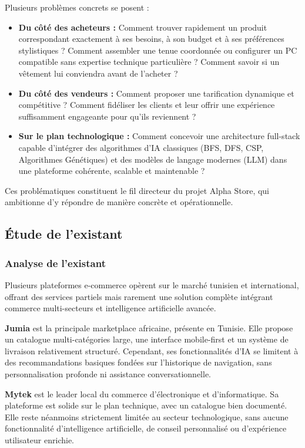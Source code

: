 Plusieurs problèmes concrets se posent :

\begin{itemize}[label=$\bullet$]
    \item \textbf{Du côté des acheteurs :} Comment trouver rapidement un produit correspondant exactement à ses besoins, à son budget et à ses préférences stylistiques ? Comment assembler une tenue coordonnée ou configurer un PC compatible sans expertise technique particulière ? Comment savoir si un vêtement lui conviendra avant de l'acheter ?
    \item \textbf{Du côté des vendeurs :} Comment proposer une tarification dynamique et compétitive ? Comment fidéliser les clients et leur offrir une expérience suffisamment engageante pour qu'ils reviennent ?
    \item \textbf{Sur le plan technologique :} Comment concevoir une architecture full-stack capable d'intégrer des algorithmes d'IA classiques (BFS, DFS, CSP, Algorithmes Génétiques) et des modèles de langage modernes (LLM) dans une plateforme cohérente, scalable et maintenable ?
\end{itemize}

Ces problématiques constituent le fil directeur du projet Alpha Store, qui ambitionne d'y répondre de manière concrète et opérationnelle.

\subsection{Étude de l'existant}

\subsubsection{Analyse de l'existant}

Plusieurs plateformes e-commerce opèrent sur le marché tunisien et international, offrant des services partiels mais rarement une solution complète intégrant commerce multi-secteurs et intelligence artificielle avancée.

\textbf{Jumia} est la principale marketplace africaine, présente en Tunisie. Elle propose un catalogue multi-catégories large, une interface mobile-first et un système de livraison relativement structuré. Cependant, ses fonctionnalités d'IA se limitent à des recommandations basiques fondées sur l'historique de navigation, sans personnalisation profonde ni assistance conversationnelle.

\textbf{Mytek} est le leader local du commerce d'électronique et d'informatique. Sa plateforme est solide sur le plan technique, avec un catalogue bien documenté. Elle reste néanmoins strictement limitée au secteur technologique, sans aucune fonctionnalité d'intelligence artificielle, de conseil personnalisé ou d'expérience utilisateur enrichie.

